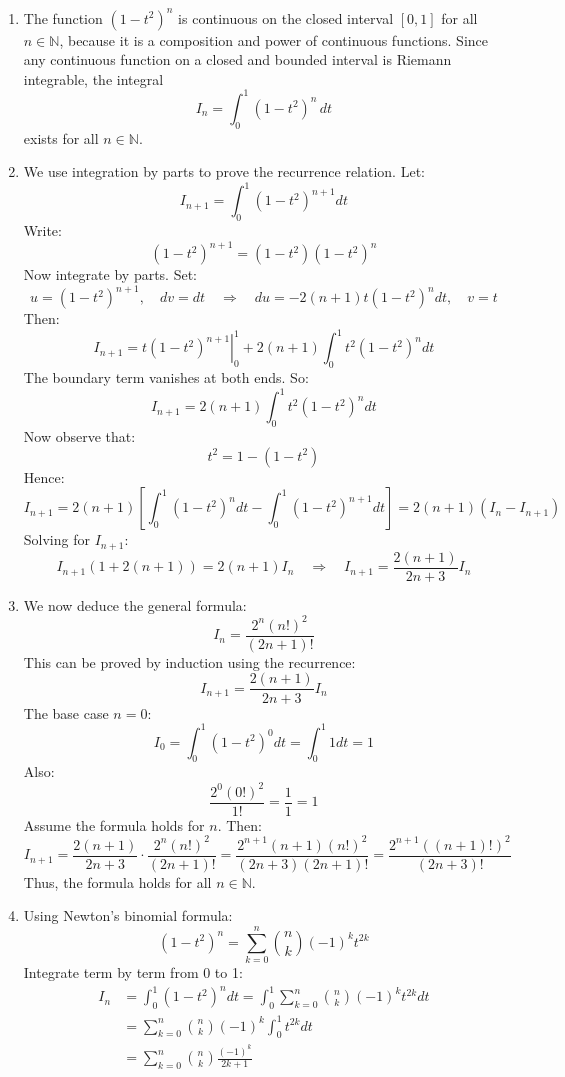 \documentclass[12pt]{article}
\begin{document}
\begin{answerbox}
  \begin{enumerate}
    \item The function $ (1 - t^2)^n $ is continuous on the closed interval $[0, 1]$ for all $ n \in \mathbb{N} $, because it is a composition and power of continuous functions. Since any continuous function on a closed and bounded interval is Riemann integrable, the integral
    $$
    I_n = \int_0^1 (1 - t^2)^n \, dt
    $$
    exists for all $ n \in \mathbb{N} $.

    \item We use integration by parts to prove the recurrence relation. Let:
    $$
    I_{n+1} = \int_0^1 (1 - t^2)^{n+1} dt
    $$
    Write:
    $$
    (1 - t^2)^{n+1} = (1 - t^2)(1 - t^2)^n
    $$
    Now integrate by parts. Set:
    $$
    u = (1 - t^2)^{n+1}, \quad dv = dt \quad \Rightarrow \quad du = -2(n+1)t(1 - t^2)^n dt, \quad v = t
    $$
    Then:
    $$
    I_{n+1} = \left. t(1 - t^2)^{n+1} \right|_0^1 + 2(n+1) \int_0^1 t^2 (1 - t^2)^n dt
    $$
    The boundary term vanishes at both ends. So:
    $$
    I_{n+1} = 2(n+1) \int_0^1 t^2 (1 - t^2)^n dt
    $$
    Now observe that:
    $$
    t^2 = 1 - (1 - t^2)
    $$
    Hence:
    $$
    I_{n+1} = 2(n+1) \left[ \int_0^1 (1 - t^2)^n dt - \int_0^1 (1 - t^2)^{n+1} dt \right]
    = 2(n+1)(I_n - I_{n+1})
    $$
    Solving for $ I_{n+1} $:
    $$
    I_{n+1}(1 + 2(n+1)) = 2(n+1)I_n \quad \Rightarrow \quad I_{n+1} = \frac{2(n+1)}{2n + 3} I_n
    $$

    \item We now deduce the general formula:
    $$
    I_n = \frac{2^n (n!)^2}{(2n + 1)!}
    $$
    This can be proved by induction using the recurrence:
    $$
    I_{n+1} = \frac{2(n+1)}{2n + 3} I_n
    $$
    The base case $ n = 0 $:
    $$
    I_0 = \int_0^1 (1 - t^2)^0 dt = \int_0^1 1 dt = 1
    $$
    Also:
    $$
    \frac{2^0 (0!)^2}{1!} = \frac{1}{1} = 1
    $$
    Assume the formula holds for $ n $. Then:
    $$
    I_{n+1} = \frac{2(n+1)}{2n + 3} \cdot \frac{2^n (n!)^2}{(2n + 1)!}
    = \frac{2^{n+1} (n+1)(n!)^2}{(2n + 3)(2n + 1)!}
    = \frac{2^{n+1} ((n+1)!)^2}{(2n + 3)!}
    $$
    Thus, the formula holds for all $ n \in \mathbb{N} $.

    \item Using Newton's binomial formula:
    $$
    (1 - t^2)^n = \sum_{k=0}^n \binom{n}{k} (-1)^k t^{2k}
    $$
    Integrate term by term from 0 to 1:
    $$
    \begin{aligned}
    I_n & = \int_0^1 (1 - t^2)^n dt = \int_0^1 \sum_{k=0}^n \binom{n}{k} (-1)^k t^{2k} dt \\
    & = \sum_{k=0}^n \binom{n}{k} (-1)^k \int_0^1 t^{2k} dt \\
    & = \sum_{k=0}^n \binom{n}{k} \frac{(-1)^k}{2k + 1}
    \end{aligned}
    $$
\end{enumerate}
\end{answerbox}

\newpage

\end{document}
